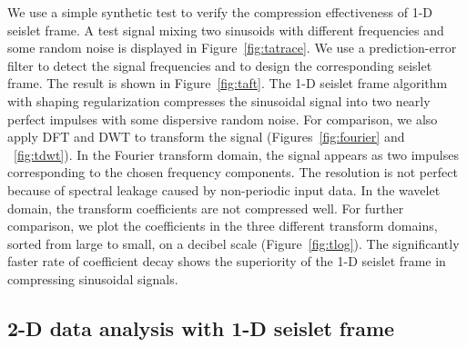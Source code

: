 We use a simple synthetic test to verify the compression
 effectiveness of 1-D seislet frame. A test signal mixing two
 sinusoids with different frequencies and some random noise is
 displayed in Figure~\ref{fig:tatrace}. We use a prediction-error
 filter to detect the signal frequencies and to design the
 corresponding seislet frame.  
The result is shown in
 Figure~\ref{fig:taft}. The 1-D seislet frame algorithm with shaping
 regularization compresses the sinusoidal signal into two nearly
 perfect impulses with some dispersive random noise. For comparison,
 we also apply DFT and DWT to transform the signal
 (Figures~\ref{fig:fourier} and ~\ref{fig:tdwt}). In the Fourier
 transform domain, the signal appears as two impulses corresponding to
 the chosen frequency components. The resolution is not perfect
 because of spectral leakage caused by non-periodic input data.
In the wavelet domain, the transform coefficients are not compressed
 well. For further comparison, we plot the coefficients in the three
 different transform domains, sorted from large to small, on a decibel
 scale (Figure~\ref{fig:tlog}). The significantly faster rate of
 coefficient decay shows the superiority of {the} 1-D seislet
 frame in compressing sinusoidal signals.



 \subsection{2-D data analysis with 1-D seislet frame} 
 
